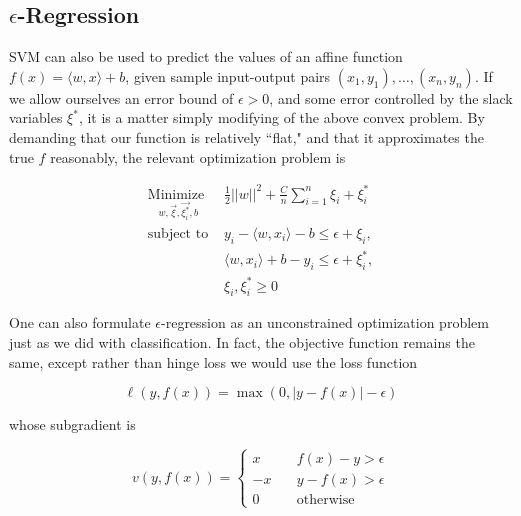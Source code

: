 \subsection{$\epsilon$-Regression}

SVM can also be used to predict the values of an affine function $f(x) = \langle w, x\rangle+b$, given sample input-output pairs $(x_1,y_1),\ldots,(x_n,y_n)$. If we allow ourselves an error bound of $\epsilon>0$, and some error controlled by the slack variables $\xi^*$, it is a matter simply modifying of the above convex problem. By demanding that our function is relatively ``flat," and that it approximates the true $f$ reasonably, the relevant optimization problem is

\begin{align*}
\underset{w,\vec{\xi},\vec{\xi^*_i},b}{\text{Minimize }} & \frac{1}{2}||w||^2 + \frac{C}{n}\sum_{i=1}^n \xi_i + \xi^*_i \\
\text{subject to } & y_i - \langle w, x_i\rangle - b \leq \epsilon + \xi_i,\\
						&  \langle w, x_i\rangle + b - y_i \leq \epsilon + \xi^*_i, \\
						& \xi_i,\xi^*_i \geq 0
\end{align*}

One can also formulate $\epsilon$-regression as an unconstrained optimization problem just as we did with classification. In fact, the objective function remains the same, except rather than hinge loss we would  use the loss function

\[ \ell(y,f(x)) = \max(0,|y-f(x)|-\epsilon) \]

whose subgradient is

$$
v(y,f(x)) = \left\{
        \begin{array}{ll}
            x & \quad f(x) - y > \epsilon \\
            -x  & \quad  y - f(x)  > \epsilon \\
            0 & \quad \text{otherwise}
        \end{array}
    \right.
$$






%












